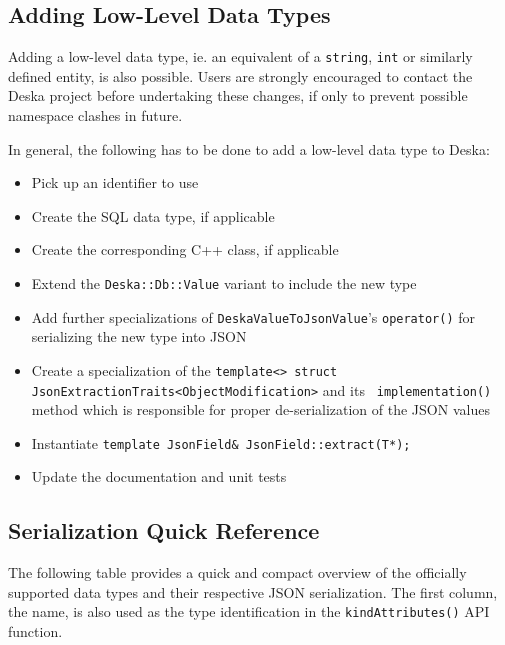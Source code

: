 \documentclass{article}
\begin{document}
\subsection{Adding Low-Level Data Types}
\label{sec:json-extending}

Adding a low-level data type, ie. an equivalent of a {\tt string}, {\tt int} or similarly defined entity, is also
possible.  Users are strongly encouraged to contact the Deska project before undertaking these changes, if only to
prevent possible namespace clashes in future.

In general, the following has to be done to add a low-level data type to Deska:

\begin{itemize}
    \item Pick up an identifier to use
    \item Create the SQL data type, if applicable
    \item Create the corresponding C++ class, if applicable
    \item Extend the {\tt Deska::Db::Value} variant to include the new type
    \item Add further specializations of {\tt DeskaValueToJsonValue}'s {\tt operator()} for serializing the new type
        into JSON
    \item Create a specialization of the {\tt template<> struct JsonExtractionTraits<ObjectModification>} and its {\tt
        implementation()} method which is responsible for proper de-serialization of the JSON values
    \item Instantiate {\tt template JsonField\& JsonField::extract(T*);}
    \item Update the documentation and unit tests
\end{itemize}

\subsection{Serialization Quick Reference}
\label{sec:json-data-types-reference}

The following table provides a quick and compact overview of the officially supported data types and their respective
JSON serialization.  The first column, the name, is also used as the type identification in the {\tt kindAttributes()}
API function.
\end{document}
